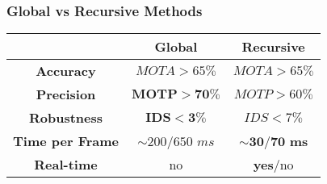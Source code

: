 %	
%	
%	
%	
%	
%	
%	

\begin{frame}
	\frametitle{Global vs Recursive Methods}
	
	\Large
	
	\vspace{0.1cm}
	
	\begin{table}[!t]
		\centering
		\renewcommand{\arraystretch}{1.15}
		\begin{tabular}{ c | c | c | }
			\cline{2-3}
			& \textbf{Global} & \textbf{Recursive} \\ \hline
			
			\multicolumn{1}{|c|}{\textbf{Accuracy}} & $ MOTA > 65\% $ & $ MOTA > 65\% $ \\ \hline
			\multicolumn{1}{|c|}{\textbf{Precision}} & $ \mathbf{MOTP > 70\%} $ & $ MOTP > 60\% $ \\
			\hline
			\multicolumn{1}{|c|}{\textbf{Robustness}} & $ \mathbf{IDS < 3\%} $ & $ IDS < 7\% $ \\
			\hline
			\multicolumn{1}{|c|}{\textbf{Time per Frame}} & $ \sim 200/650 $ $ ms $ &
			$ \mathbf{\boldsymbol{\sim} 30/70} $ \textbf{ms} \\ \hline
			\multicolumn{1}{|c|}{\textbf{Real-time}} & no & \textbf{yes}/no \\ \hline
		\end{tabular}
	\end{table}
\end{frame}
